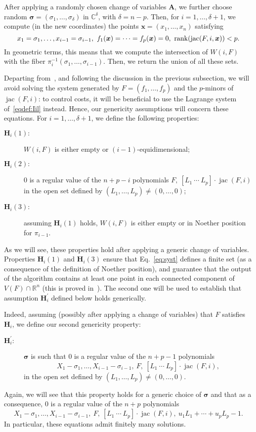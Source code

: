 \documentclass[12pt]{article}
\def\mA{{\bm A}}
\def\xb{{\bm x}}
\DeclareMathOperator{\jac}{jac}
\def\C{\mathbb{C}}
\def\R{\mathbb{R}}
\begin{document}
After applying a randomly chosen change of variables $\mA$, we further
choose random $\bm\sigma=(\sigma_1,\dots,\sigma_{\delta})$ in
$\C^{\delta}$, with $\delta = n -p$. Then, for $i=1,\dots,\delta+1$,
we compute (in the new coordinates) the points $\xb=(x_1,\dots,x_n)$
satisfying
\begin{equation}\label{eq:syst}
x_1 = \sigma_1,\hdots,x_{i-1} = \sigma_{i-1},\ f_1(\xb)=\cdots=f_p(\xb)=0,\ {\rm rank} (\jac(F, i,\xb)) < p.
\end{equation}
In geometric terms, this means that we compute the intersection of
$W(i,F)$ with the fiber $\pi_i^{-1}(\sigma_1,\dots,\sigma_{i-1})$.
Then, we return the union of all these sets.

Departing from~\cite{EMP}, and following the discussion in the
previous subsection, we will avoid solving the system generated by
$F=(f_1,\dots,f_p)$ and the $p$-minors of $\jac(F, i)$: to control
costs, it will be beneficial to use the Lagrange system
of~\eqref{eqdef:Iil} instead. Hence, our genericity assumptions will
concern these equations. For $i=1,\dots,\delta+1$, we define the
following properties:
\begin{description}
\item [$\bm H_i(1):$] $W(i,F)$ is either empty or $(i-1)$-equidimensional;
\item [$\bm H_i(2):$] $0$ is a regular value of the $n+p-i$ polynomials
  $F,\ [L_1~\cdots~L_p]\cdot \jac(F, i)$ in the open set defined by
  $(L_1,\dots,L_p) \ne (0,\dots,0)$;
\item [$\bm H_i(3):$] assuming $\bm H_i(1)$ holds, $W(i,F)$ is either
  empty or in Noether position for $\pi_{i-1}$.
\end{description}
As we will see, these properties hold after applying a generic change
of variables. Properties $\bm H_i(1)$ and $\bm H_i(3)$ ensure that
Eq.~\eqref{eq:syst} defines a finite set (as a consequence of the
definition of Noether position), and guarantee that the output of the
algorithm contains at least one point in each connected component of
$V(F) \cap \R^n$ (this is proved in~\cite[Theorem~2]{EMP}). The second
one will be used to establish that assumption $\bm H^{'}_i$ defined
below holds generically.

Indeed, assuming (possibly after applying a change of variables) that
$F$ satisfies $\bm H_i$, we define our second genericity property:
\begin{description}
\item [$\bm H^{'}_i:$] $\bm \sigma$ is such that $0$ is a regular value of the $n+p-1$
  polynomials
  \[ X_1 - \sigma_1, \dots, X_{i-1} - \sigma_{i-1},\ F,\ [L_1~\cdots~L_p]\cdot \jac(F, i), \]
  in the open set defined by $(L_1,\dots,L_p) \ne (0,\dots,0)$.
\end{description}
Again, we will see that this property holds for a generic choice of
$\bm\sigma$ and that as a consequence, $0$ is a regular value of the
$n+p$ polynomials
\begin{equation}\label{eq:syst2}
  X_1 - \sigma_1, \dots, X_{i-1} - \sigma_{i-1},\ F,\ [L_1~\cdots~L_p]\cdot \jac(F, i),\ u_1 L_1 + \cdots + u_p L_p -1.
\end{equation}
In particular, these equations admit finitely many solutions.
\end{document}
